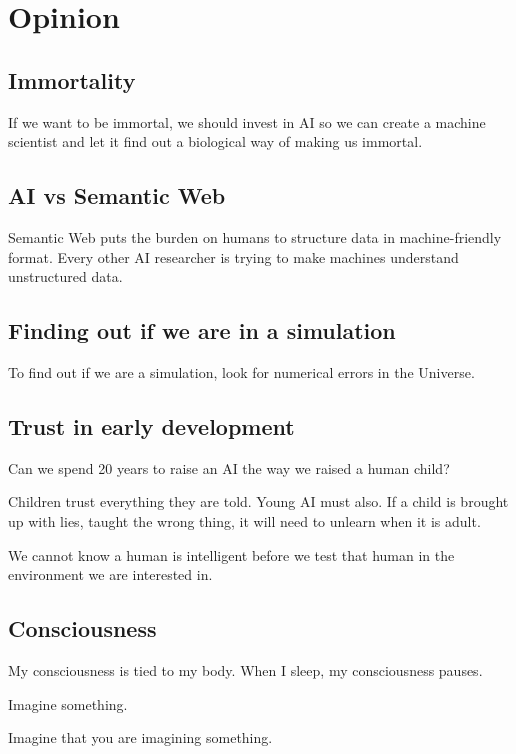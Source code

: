 \chapter{Opinion}

\section{Immortality}

If we want to be immortal,
we should invest in AI so we can create a machine scientist
and let it find out a biological way of making us immortal.

\section{AI vs Semantic Web}

Semantic Web puts the burden on humans to structure data in machine-friendly format.
Every other AI researcher is trying to make machines understand unstructured data.

\section{Finding out if we are in a simulation}

To find out if we are a simulation,
look for numerical errors in the Universe.
\cite{UniNumError}

\section{Trust in early development}

Can we spend 20 years to raise an AI the way we raised a human child?

Children trust everything they are told.
Young AI must also.
If a child is brought up with lies, taught the wrong thing,
it will need to unlearn when it is adult.

We cannot know a human is intelligent before we test
that human in the environment we are interested in.

\section{Consciousness}

My consciousness is tied to my body.
When I sleep, my consciousness pauses.

Imagine something.

Imagine that you are imagining something.

